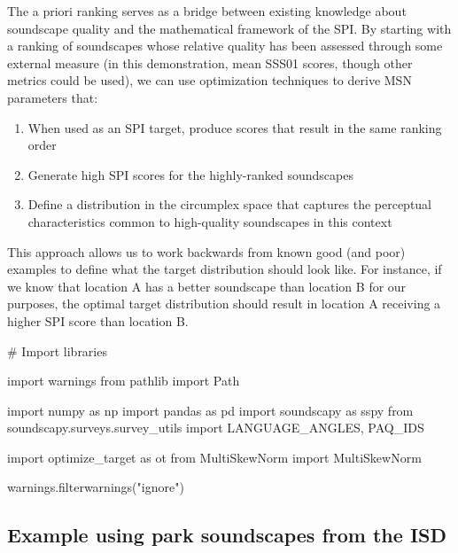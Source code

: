 \documentclass[
  authoryear,
  preprint,
  3p]{elsarticle}
\newenvironment{Shaded}{\begin{snugshade}}{\end{snugshade}}
\newcommand{\CommentTok}[1]{\textcolor[rgb]{0.37,0.37,0.37}{#1}}
\newcommand{\ImportTok}[1]{\textcolor[rgb]{0.00,0.46,0.62}{#1}}
\newcommand{\NormalTok}[1]{\textcolor[rgb]{0.00,0.23,0.31}{#1}}
\newcommand{\StringTok}[1]{\textcolor[rgb]{0.13,0.47,0.30}{#1}}
\providecommand{\tightlist}{%
  \setlength{\itemsep}{0pt}\setlength{\parskip}{0pt}}\usepackage{longtable,booktabs,array}
\begin{document}
The a priori ranking serves as a bridge between existing knowledge about
soundscape quality and the mathematical framework of the SPI. By
starting with a ranking of soundscapes whose relative quality has been
assessed through some external measure (in this demonstration, mean
SSS01 scores, though other metrics could be used), we can use
optimization techniques to derive MSN parameters that:

\begin{enumerate}
\def\labelenumi{\arabic{enumi}.}
\tightlist
\item
  When used as an SPI target, produce scores that result in the same
  ranking order
\item
  Generate high SPI scores for the highly-ranked soundscapes
\item
  Define a distribution in the circumplex space that captures the
  perceptual characteristics common to high-quality soundscapes in this
  context
\end{enumerate}

This approach allows us to work backwards from known good (and poor)
examples to define what the target distribution should look like. For
instance, if we know that location A has a better soundscape than
location B for our purposes, the optimal target distribution should
result in location A receiving a higher SPI score than location B.

\begin{Shaded}
\begin{Highlighting}[]
\CommentTok{\# Import libraries}

\ImportTok{import}\NormalTok{ warnings}
\ImportTok{from}\NormalTok{ pathlib }\ImportTok{import}\NormalTok{ Path}

\ImportTok{import}\NormalTok{ numpy }\ImportTok{as}\NormalTok{ np}
\ImportTok{import}\NormalTok{ pandas }\ImportTok{as}\NormalTok{ pd}
\ImportTok{import}\NormalTok{ soundscapy }\ImportTok{as}\NormalTok{ sspy}
\ImportTok{from}\NormalTok{ soundscapy.surveys.survey\_utils }\ImportTok{import}\NormalTok{ LANGUAGE\_ANGLES, PAQ\_IDS}

\ImportTok{import}\NormalTok{ optimize\_target }\ImportTok{as}\NormalTok{ ot}
\ImportTok{from}\NormalTok{ MultiSkewNorm }\ImportTok{import}\NormalTok{ MultiSkewNorm}

\NormalTok{warnings.filterwarnings(}\StringTok{"ignore"}\NormalTok{)}
\end{Highlighting}
\end{Shaded}

\subsection{Example using park soundscapes from the
ISD}\label{example-using-park-soundscapes-from-the-isd}
\end{document}
